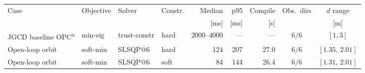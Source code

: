 \begin{tabular}{llllrrrcc}
\toprule
Case & Objective & Solver & Constr. & Median & p95 & Compile & Obs.\ dirs & $d$ range \\
 & & & & [ms] & [ms] & [s] & & [m] \\
\midrule
JGCD baseline OPC\textsuperscript{a} & min-eig & trust-constr & hard & $2000$--$4000$ & --- & --- & $6/6$ & $[1,3]$ \\
Open-loop orbit & soft-min & SLSQP@6 & hard & 124 & 207 & 27.0 & $6/6$ & $[1.35,\,2.01]$ \\
Open-loop orbit & soft-min & SLSQP@6 & soft & 84 & 144 & 26.4 & $6/6$ & $[1.31,\,2.01]$ \\
\bottomrule
\end{tabular}